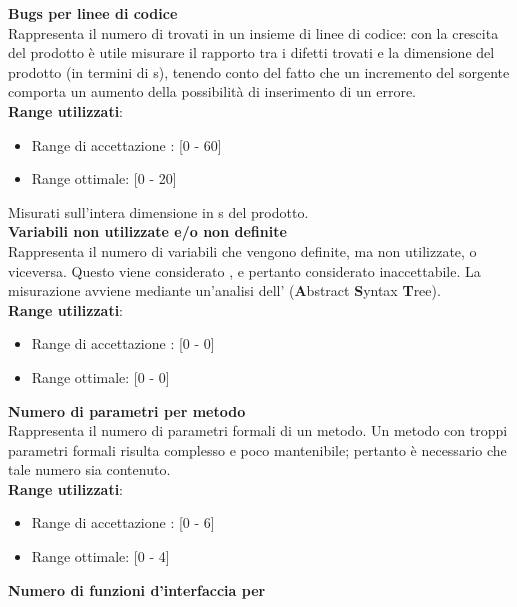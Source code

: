 \textbf{Bugs per linee di codice}\\

Rappresenta il numero di  trovati in un insieme di linee di codice: con la crescita del prodotto è utile misurare il rapporto tra i difetti trovati e la dimensione del prodotto (in termini di s), tenendo conto del fatto che un incremento del sorgente comporta un aumento della possibilità di inserimento di un errore. \\

\textbf{Range utilizzati}:
\begin{itemize}
	\item Range di accettazione : [0 - 60]
	\item Range ottimale: [0 - 20]
\end{itemize}
Misurati sull'intera dimensione in s del prodotto.\\

\textbf{Variabili non utilizzate e/o non definite}\\

Rappresenta il numero di variabili che vengono definite, ma non utilizzate, o viceversa. Questo viene considerato , e pertanto considerato inaccettabile. La misurazione avviene mediante un'analisi dell'\textbf{} (\textbf{A}bstract \textbf{S}yntax \textbf{T}ree). \\

\textbf{Range utilizzati}:
\begin{itemize}
	\item Range di accettazione : [0 - 0]
	\item Range ottimale: [0 - 0]
\end{itemize}


\textbf{Numero di parametri per metodo}\\

Rappresenta il numero di parametri formali di un metodo. Un metodo con troppi parametri formali risulta complesso e poco mantenibile; pertanto è necessario che tale numero sia contenuto. \\

\textbf{Range utilizzati}:
\begin{itemize}
	\item Range di accettazione : [0 - 6]
	\item Range ottimale: [0 - 4]
\end{itemize}

\textbf{Numero di funzioni d'interfaccia per }\\

